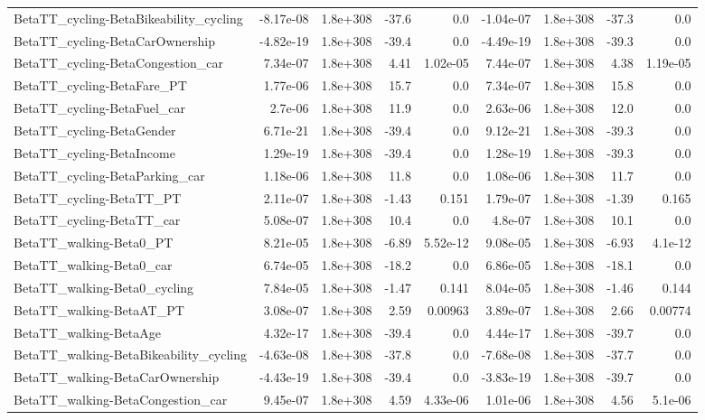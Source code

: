 \begin{tabular}{lrrrrrrrr}
BetaTT_cycling-BetaBikeability_cycling & -8.17e-08 & 1.8e+308 & -37.6 & 0.0 & -1.04e-07 & 1.8e+308 & -37.3 & 0.0 \\
BetaTT_cycling-BetaCarOwnership & -4.82e-19 & 1.8e+308 & -39.4 & 0.0 & -4.49e-19 & 1.8e+308 & -39.3 & 0.0 \\
BetaTT_cycling-BetaCongestion_car & 7.34e-07 & 1.8e+308 & 4.41 & 1.02e-05 & 7.44e-07 & 1.8e+308 & 4.38 & 1.19e-05 \\
BetaTT_cycling-BetaFare_PT & 1.77e-06 & 1.8e+308 & 15.7 & 0.0 & 7.34e-07 & 1.8e+308 & 15.8 & 0.0 \\
BetaTT_cycling-BetaFuel_car & 2.7e-06 & 1.8e+308 & 11.9 & 0.0 & 2.63e-06 & 1.8e+308 & 12.0 & 0.0 \\
BetaTT_cycling-BetaGender & 6.71e-21 & 1.8e+308 & -39.4 & 0.0 & 9.12e-21 & 1.8e+308 & -39.3 & 0.0 \\
BetaTT_cycling-BetaIncome & 1.29e-19 & 1.8e+308 & -39.4 & 0.0 & 1.28e-19 & 1.8e+308 & -39.3 & 0.0 \\
BetaTT_cycling-BetaParking_car & 1.18e-06 & 1.8e+308 & 11.8 & 0.0 & 1.08e-06 & 1.8e+308 & 11.7 & 0.0 \\
BetaTT_cycling-BetaTT_PT & 2.11e-07 & 1.8e+308 & -1.43 & 0.151 & 1.79e-07 & 1.8e+308 & -1.39 & 0.165 \\
BetaTT_cycling-BetaTT_car & 5.08e-07 & 1.8e+308 & 10.4 & 0.0 & 4.8e-07 & 1.8e+308 & 10.1 & 0.0 \\
BetaTT_walking-Beta0_PT & 8.21e-05 & 1.8e+308 & -6.89 & 5.52e-12 & 9.08e-05 & 1.8e+308 & -6.93 & 4.1e-12 \\
BetaTT_walking-Beta0_car & 6.74e-05 & 1.8e+308 & -18.2 & 0.0 & 6.86e-05 & 1.8e+308 & -18.1 & 0.0 \\
BetaTT_walking-Beta0_cycling & 7.84e-05 & 1.8e+308 & -1.47 & 0.141 & 8.04e-05 & 1.8e+308 & -1.46 & 0.144 \\
BetaTT_walking-BetaAT_PT & 3.08e-07 & 1.8e+308 & 2.59 & 0.00963 & 3.89e-07 & 1.8e+308 & 2.66 & 0.00774 \\
BetaTT_walking-BetaAge & 4.32e-17 & 1.8e+308 & -39.4 & 0.0 & 4.44e-17 & 1.8e+308 & -39.7 & 0.0 \\
BetaTT_walking-BetaBikeability_cycling & -4.63e-08 & 1.8e+308 & -37.8 & 0.0 & -7.68e-08 & 1.8e+308 & -37.7 & 0.0 \\
BetaTT_walking-BetaCarOwnership & -4.43e-19 & 1.8e+308 & -39.4 & 0.0 & -3.83e-19 & 1.8e+308 & -39.7 & 0.0 \\
BetaTT_walking-BetaCongestion_car & 9.45e-07 & 1.8e+308 & 4.59 & 4.33e-06 & 1.01e-06 & 1.8e+308 & 4.56 & 5.1e-06 \\

\end{tabular}
